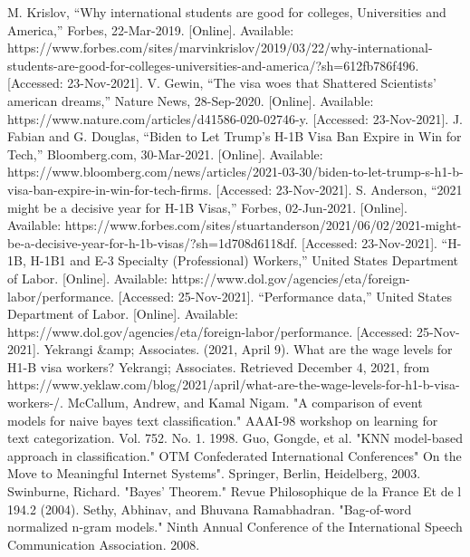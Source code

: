 \documentclass[conference]{IEEEtran}
\begin{document}

\begin{thebibliography}{00}
 M. Krislov, “Why international students are good for colleges, Universities and America,” Forbes, 22-Mar-2019. [Online]. Available: https://www.forbes.com/sites/marvinkrislov/2019/03/22/why-international-students-are-good-for-colleges-universities-and-america/?sh=612fb786f496. [Accessed: 23-Nov-2021]. 
 V. Gewin, “The visa woes that Shattered Scientists' american dreams,” Nature News, 28-Sep-2020. [Online]. Available: https://www.nature.com/articles/d41586-020-02746-y. [Accessed: 23-Nov-2021]. 
 J. Fabian and G. Douglas, “Biden to Let Trump’s H-1B Visa Ban Expire in Win for Tech,” Bloomberg.com, 30-Mar-2021. [Online]. Available: https://www.bloomberg.com/news/articles/2021-03-30/biden-to-let-trump-s-h1-b-visa-ban-expire-in-win-for-tech-firms. [Accessed: 23-Nov-2021].
 S. Anderson, “2021 might be a decisive year for H-1B Visas,” Forbes, 02-Jun-2021. [Online]. Available: https://www.forbes.com/sites/stuartanderson/2021/06/02/2021-might-be-a-decisive-year-for-h-1b-visas/?sh=1d708d6118df. [Accessed: 23-Nov-2021]. 
 “H-1B, H-1B1 and E-3 Specialty (Professional) Workers,” United States Department of Labor. [Online]. Available: https://www.dol.gov/agencies/eta/foreign-labor/performance. [Accessed: 25-Nov-2021]. 
 “Performance data,” United States Department of Labor. [Online]. Available: https://www.dol.gov/agencies/eta/foreign-labor/performance. [Accessed: 25-Nov-2021]. 
 Yekrangi &amp; Associates. (2021, April 9). What are the wage levels for H1-B visa workers? Yekrangi; Associates. Retrieved December 4, 2021, from https://www.yeklaw.com/blog/2021/april/what-are-the-wage-levels-for-h1-b-visa-workers-/. 
 McCallum, Andrew, and Kamal Nigam. "A comparison of event models for naive bayes text classification." AAAI-98 workshop on learning for text categorization. Vol. 752. No. 1. 1998.
Guo, Gongde, et al. "KNN model-based approach in classification." OTM Confederated International Conferences" On the Move to Meaningful Internet Systems". Springer, Berlin, Heidelberg, 2003.
Swinburne, Richard. "Bayes' Theorem." Revue Philosophique de la France Et de l 194.2 (2004).
Sethy, Abhinav, and Bhuvana Ramabhadran. "Bag-of-word normalized n-gram models." Ninth Annual Conference of the International Speech Communication Association. 2008.
\end{thebibliography}
\end{document}
